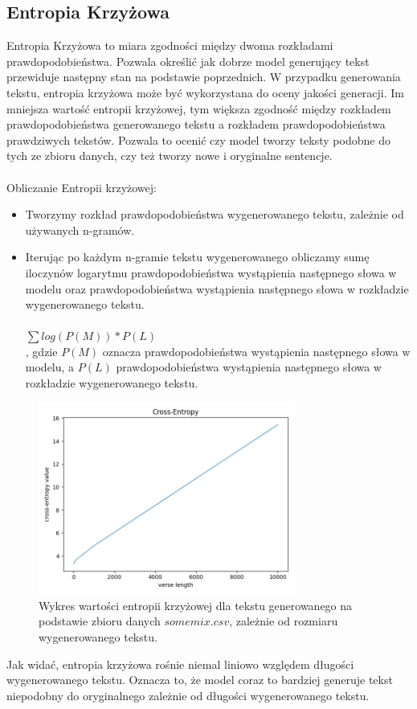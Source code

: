 \documentclass{article}
\begin{document}
\subsection{Entropia Krzyżowa}
Entropia Krzyżowa to miara zgodności między dwoma rozkładami prawdopodobieństwa. Pozwala określić jak dobrze model generujący tekst przewiduje następny stan na podstawie poprzednich. W przypadku generowania tekstu, entropia krzyżowa może być wykorzystana do oceny jakości generacji. Im mniejsza wartość entropii krzyżowej, tym większa zgodność między rozkładem prawdopodobieństwa generowanego tekstu a rozkładem prawdopodobieństwa prawdziwych tekstów. Pozwala to ocenić czy model tworzy teksty podobne do tych ze zbioru danych, czy też tworzy nowe i oryginalne sentencje.
\\\\
Obliczanie Entropii krzyżowej:
\begin{itemize}
    \item Tworzymy rozkład prawdopodobieństwa wygenerowanego tekstu, zależnie od używanych n-gramów.
    \item Iterując po każdym n-gramie tekstu wygenerowanego obliczamy sumę iloczynów logarytmu prawdopodobieństwa wystąpienia następnego słowa w modelu oraz prawdopodobieństwa wystąpienia następnego słowa w rozkładzie wygenerowanego tekstu. \\\\ $\sum log(P(M)) * P(L)$ \\ , gdzie $P(M)$ oznacza prawdopodobieństwa wystąpienia następnego słowa w modelu, a $P(L)$ prawdopodobieństwa wystąpienia następnego słowa w rozkładzie wygenerowanego tekstu.
\end{itemize}
\begin{figure}[h]
    \centering
    \includegraphics[width=0.75\textwidth]{cross-entropy}
    \caption{Wykres wartości entropii krzyżowej dla tekstu generowanego na podstawie zbioru danych $somemix.csv$, zależnie od rozmiaru wygenerowanego tekstu.}
    \label{fig:mesh1}
\end{figure}
\FloatBarrier
Jak widać, entropia krzyżowa rośnie niemal liniowo względem długości wygenerowanego tekstu. Oznacza to, że model coraz to bardziej generuje tekst niepodobny do oryginalnego zależnie od długości wygenerowanego tekstu.
\end{document}
